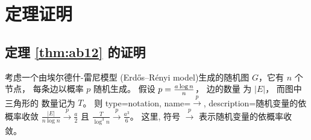 \section{定理证明}\label{sec:sibm_proof}
\subsection{定理 \ref{thm:ab12} 的证明}
\begin{lemma}\label{lem:ER_tr_counting}
  考虑一个由埃尔德什-雷尼模型 (Erdős–Rényi model)生成的随机图 $G$，它有  $n$
  个节点， 每条边以概率 $p$ 随机生成\cite{erdHos1960evolution}。
   假设
	$p=\frac{a \log n}{n}$， 边的数量
  为  $|E|$， 
  而图中三角形的
  数量记为  $T$。 则
{
  type=notation,
  name={$\xrightarrow{p}$},
  description={随机变量的依概率收敛}
}
	$\frac{|E|}{n \log n} \xrightarrow{p} \frac{a}{2}$ 且
  $\frac{T}{\log^3 n} \xrightarrow{p} \frac{a^3}{6}$。
  这里, 符号 $\xrightarrow{p}$ 表示随机变量的依概率收敛。
\end{lemma}
